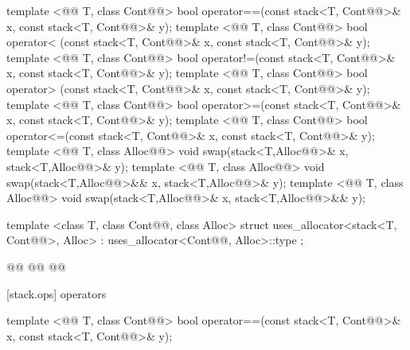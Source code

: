 \documentclass[american,twoside]{book}
\begin{document}
\begin{codeblock}
{  template <@@ T, class Cont@@>
    bool operator==(const stack<T, Cont@@>& x, const stack<T, Cont@@>& y);
  template <@@ T, class Cont@@>
    bool operator< (const stack<T, Cont@@>& x, const stack<T, Cont@@>& y);
  template <@@ T, class Cont@@>
    bool operator!=(const stack<T, Cont@@>& x, const stack<T, Cont@@>& y);
  template <@@ T, class Cont@@>
    bool operator> (const stack<T, Cont@@>& x, const stack<T, Cont@@>& y);
  template <@@ T, class Cont@@>
    bool operator>=(const stack<T, Cont@@>& x, const stack<T, Cont@@>& y);
  template <@@ T, class Cont@@>
    bool operator<=(const stack<T, Cont@@>& x, const stack<T, Cont@@>& y);
  template <@@ T, class Alloc@@>
    void swap(stack<T,Alloc@@>& x, stack<T,Alloc@@>& y);
  template <@@ T, class Alloc@@>
    void swap(stack<T,Alloc@@>&& x, stack<T,Alloc@@>& y);
  template <@@ T, class Alloc@@>
    void swap(stack<T,Alloc@@>& x, stack<T,Alloc@@>&& y);

  template <class T, class Cont@@, class Alloc>
    struct uses_allocator<stack<T, Cont@@>, Alloc>
      : uses_allocator<Cont@@, Alloc>::type { };

  @@
    @@
      @@
}
\end{codeblock}

[stack.ops]{ operators}

%
\begin{itemdecl}
template <@@ T, class Cont@@>
    bool operator==(const stack<T, Cont@@>& x,
                    const stack<T, Cont@@>& y);
\end{itemdecl}
\end{document}
